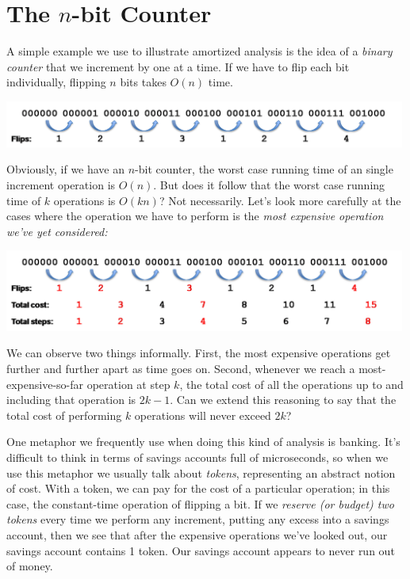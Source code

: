 \section{The $n$-bit Counter}
\label{sec:ubarrays:counter}

A simple example we use to illustrate amortized analysis is the idea
of a \emph{binary counter} that we increment by one at a time. If we
have to flip each bit individually, flipping $n$ bits takes $O(n)$
time.
\begin{center}
\includegraphics[width=0.99\textwidth]{img/bincount1.png}
\end{center}
Obviously, if we have an $n$-bit counter, the worst case running time
of an single increment operation is $O(n)$. But does it follow that
the worst case running time of $k$ operations is $O(kn)$? Not
necessarily. Let's look more carefully at the cases where the
operation we have to perform is the \emph{most expensive operation
  we've yet considered:}
\begin{center}
\includegraphics[width=0.99\textwidth]{img/bincount2.png}
\end{center}
We can observe two things informally. First, the most expensive
operations get further and further apart as time goes on. Second,
whenever we reach a most-expensive-so-far operation at step $k$, the
total cost of all the operations up to and including that operation is
$2k-1$. Can we extend this reasoning to say that the total cost of
performing $k$ operations will never exceed $2k$?

One metaphor we frequently use when doing this kind of analysis is
banking.  It's difficult to think in terms of savings accounts full of
microseconds, so when we use this metaphor we usually talk about
\emph{tokens}, representing an abstract notion of cost. With a token,
we can pay for the cost of a particular operation; in this case, the
constant-time operation of flipping a bit. If we \emph{reserve (or
  budget) two tokens} every time we perform any increment, putting any
excess into a savings account, then we see that after the expensive
operations we've looked out, our savings account contains 1 token.
Our savings account appears to never run out of money.

